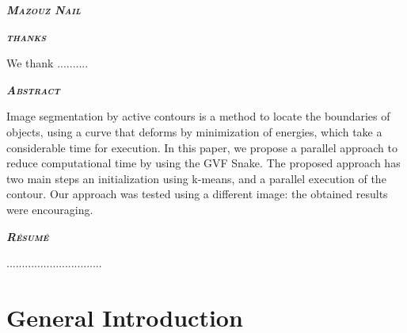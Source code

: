 \documentclass[english,a4,12pt]{report}
\begin{document}
    \begin{flushright}
        \textbf{\textsc{\itshape Mazouz Nail}}
    \end{flushright}

    \newpage
    \begin{center}
        \textbf{\huge \textsc{\itshape thanks}}
    \end{center}
    \textsf{\qquad We thank .......... }

    \newpage
    \begin{center}
    \textbf{\huge \textsc{\itshape \textit Abstract}}\\
    \end{center}
    \qquad Image segmentation by active contours is a method to locate the boundaries of objects,
    using a curve that deforms by minimization of energies, which take a considerable time for execution.
    In this paper, we propose a parallel approach to reduce computational time by using the GVF Snake.
    The proposed approach has two main steps an initialization using k-means, and a parallel execution of the contour.
    Our approach was tested using a different image: the obtained results were encouraging.

    \newpage
    \newcommand{\enteteresume}{\markboth{Resume}{Resume}} %
    \begin{center}
    \textbf{\huge \textsc{\itshape \textit Résumé}}\\
    \end{center}
    \qquad ...............................

    \tableofcontents
    \listoffigures
    \listoftables

    \chapter*{General Introduction}
    \setcounter{page}{1}
    \lhead{}
    \cfoot{\bfseries \thepage}
\end{document}
